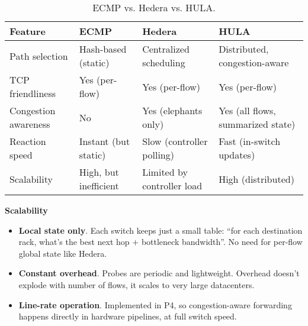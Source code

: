 \begin{table}[!htp]
    \centering
    \begin{adjustbox}{width={\textwidth},totalheight={\textheight},keepaspectratio}
        \begin{tabular}{@{} l l l l @{}}
            \toprule
            Feature & ECMP & Hedera \cite{al2010hedera} & HULA \cite{katta2016hula} \\
            \midrule
            Path selection          & Hash-based (static)   & Centralized scheduling        & Distributed, congestion-aware     \\[.3em]
            TCP friendliness        & Yes (per-flow)        & Yes (per-flow)                & Yes (per-flow)                    \\[.3em]
            Congestion awareness    & No                    & Yes (elephants only)          & Yes (all flows, summarized state) \\[.3em]
            Reaction speed          & Instant (but static)  & Slow (controller polling)     & Fast (in-switch updates)          \\[.3em]
            Scalability             & High, but inefficient & Limited by controller load    & High (distributed)                \\
            \bottomrule
        \end{tabular}
    \end{adjustbox}
    \caption{ECMP vs. Hedera vs. HULA.}
\end{table}

\begin{flushleft}
    \textcolor{Green3}{ \textbf{Scalability}}
\end{flushleft}
\begin{itemize}
    \item \textbf{Local state only}. Each switch keeps just a small table: ``for each destination rack, what's the best next hop $+$ bottleneck bandwidth''. No need for per-flow global state like Hedera.
    \item \textbf{Constant overhead}. Probes are periodic and lightweight. Overhead doesn't explode with number of flows, it scales to very large datacenters.
    \item \textbf{Line-rate operation}. Implemented in P4, so congestion-aware forwarding happens directly in hardware pipelines, at full switch speed.
\end{itemize}

